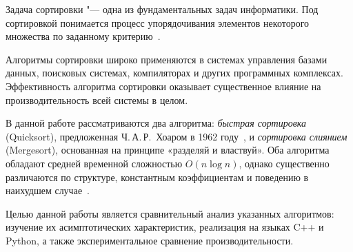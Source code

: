 Задача сортировки "--- одна из фундаментальных задач информатики. Под сортировкой понимается
процесс упорядочивания элементов некоторого множества по заданному критерию~\cite{knuth1997art}.

Алгоритмы сортировки широко применяются в системах управления базами данных, поисковых
системах, компиляторах и других программных комплексах. Эффективность алгоритма сортировки
оказывает существенное влияние на производительность всей системы в целом.

В данной работе рассматриваются два алгоритма: \textit{быстрая сортировка} (Quicksort),
предложенная Ч.\,А.\,Р.~Хоаром в 1962 году~\cite{hoare1962quicksort}, и
\textit{сортировка слиянием} (Mergesort), основанная на принципе «разделяй и властвуй».
Оба алгоритма обладают средней временной сложностью $O(n \log n)$, однако существенно
различаются по структуре, константным коэффициентам и поведению в наихудшем случае~\cite{cormen2009algorithms}.

Целью данной работы является сравнительный анализ указанных алгоритмов: изучение их
асимптотических характеристик, реализация на языках C++ и Python, а также экспериментальное
сравнение производительности.
